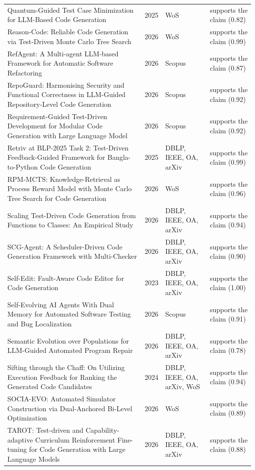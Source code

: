 \begin{longtable}{@{}%
  >{\raggedright\arraybackslash}p{}c%
  >{\raggedright\arraybackslash}p{}%
  >{\raggedright\arraybackslash}p{}@{}}
Quantum-Guided Test Case Minimization for LLM-Based Code Generation & 2025 & WoS & supports the claim (0.82) \\
Reason-Code: Reliable Code Generation via Test-Driven Monte Carlo Tree Search & 2026 & WoS & supports the claim (0.99) \\
RefAgent: A Multi-agent LLM-based Framework for Automatic Software Refactoring & 2026 & Scopus & supports the claim (0.87) \\
RepoGuard: Harmonising Security and Functional Correctness in LLM-Guided Repository-Level Code Generation & 2026 & Scopus & supports the claim (0.92) \\
Requirement-Guided Test-Driven Development for Modular Code Generation with Large Language Model & 2026 & Scopus & supports the claim (0.92) \\
Retriv at BLP-2025 Task 2: Test-Driven Feedback-Guided Framework for Bangla-to-Python Code Generation & 2025 & DBLP, IEEE, OA, arXiv & supports the claim (0.99) \\
RPM-MCTS: Knowledge-Retrieval as Process Reward Model with Monte Carlo Tree Search for Code Generation & 2026 & WoS & supports the claim (0.96) \\
Scaling Test-Driven Code Generation from Functions to Classes: An Empirical Study & 2026 & DBLP, IEEE, OA, arXiv & supports the claim (0.94) \\
SCG-Agent: A Scheduler-Driven Code Generation Framework with Multi-Checker & 2026 & DBLP, IEEE, OA, arXiv & supports the claim (0.90) \\
Self-Edit: Fault-Aware Code Editor for Code Generation & 2023 & DBLP, IEEE, OA, arXiv & supports the claim (1.00) \\
Self-Evolving AI Agents With Dual Memory for Automated Software Testing and Bug Localization & 2026 & Scopus & supports the claim (0.91) \\
Semantic Evolution over Populations for LLM-Guided Automated Program Repair & 2026 & DBLP, IEEE, OA, arXiv & supports the claim (0.78) \\
Sifting through the Chaff: On Utilizing Execution Feedback for Ranking the Generated Code Candidates & 2024 & DBLP, IEEE, OA, arXiv, WoS & supports the claim (0.94) \\
SOCIA-EVO: Automated Simulator Construction via Dual-Anchored Bi-Level Optimization & 2026 & WoS & supports the claim (0.89) \\
TAROT: Test-driven and Capability-adaptive Curriculum Reinforcement Fine-tuning for Code Generation with Large Language Models & 2026 & DBLP, IEEE, OA, arXiv & supports the claim (0.88) \\

\end{longtable}
